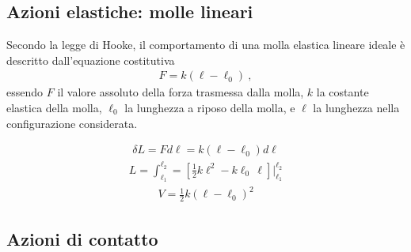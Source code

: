 \documentclass[letterpaper,10pt,italian]{jupyterBook}
\begin{document}
\subsection{Azioni elastiche: molle lineari}
\label{\detokenize{ch/mechanics/actions-examples:azioni-elastiche-molle-lineari}}
\sphinxAtStartPar
Secondo la legge di Hooke, il comportamento di una molla elastica lineare ideale è descritto dall’equazione costitutiva
\begin{equation*}
\begin{split}F = k (\ell - \ell_0) \ ,\end{split}
\end{equation*}
\sphinxAtStartPar
essendo \(F\) il valore assoluto della forza trasmessa dalla molla, \(k\) la costante elastica della molla, \(\ell_0\) la lunghezza a riposo della molla, e \(\ell\) la lunghezza nella configurazione considerata.

\sphinxAtStartPar
{}
\begin{equation*}
\begin{split}\delta L =  F d \ell = k (\ell - \ell_0) d \ell\end{split}
\end{equation*}\begin{equation*}
\begin{split}L = \int_{\ell_1}^{\ell_2} = \left[ \frac{1}{2} k \ell^2 - k \ell_0 \, \ell \right]\bigg|_{\ell_1}^{\ell_2}\end{split}
\end{equation*}\begin{equation*}
\begin{split}V = \frac{1}{2} k (\ell - \ell_0)^2\end{split}
\end{equation*}

\subsection{Azioni di contatto}
\label{\detokenize{ch/mechanics/actions-examples:azioni-di-contatto}}
\end{document}
